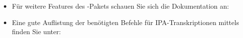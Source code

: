 %
%
%
%


\begin{frame}[fragile]

\begin{itemize}
	\item Für weitere Features des -Pakets schauen Sie sich die Dokumentation an: \citet{Rei04a}
	
	\item Eine gute Auflistung der benötigten Befehle für IPA-Transkriptionen mittels  finden Sie unter: \citet{Linke05a}
\end{itemize}

\end{frame}



